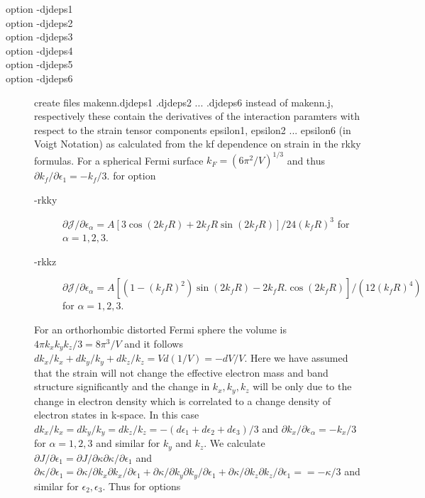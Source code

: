\begin{description}
\begin{description}
\item[option {\prg -djdeps1}]
\item[option {\prg  -djdeps2}]
\item[option {\prg -djdeps3}]
\item[option {\prg -djdeps4}]
\item[option {\prg  -djdeps5}]
\item[option {\prg -djdeps6 }]  create files {\prg makenn.djdeps1 .djdeps2 ... .djdeps6 }
instead of {\prg makenn.j}, respectively
 these contain the derivatives of the interaction paramters with respect to
 the strain tensor components epsilon1, epsilon2 ... epsilon6 (in Voigt Notation) as 
 calculated from the kf dependence on strain in the rkky formulas.
 For a spherical Fermi surface $k_F=(6\pi^2/V)^{1/3}$ and thus
$\partial k_f/\partial \epsilon_1=-k_f/3 $. 
 for option
\begin{description}
\item[-rkky]   $ \partial {\mathcal J}/\partial \epsilon_{\alpha} = A[3\cos(2k_fR)+2k_f R \sin(2k_fR)]/24(k_fR)^3$ for $\alpha=1,2,3$.
\item[-rkkz]  $ \partial {\mathcal J}/\partial \epsilon_{\alpha} =  A[(1-(k_fR)^2)\sin(2k_fR)-2k_fR.\cos(2k_fR)]/(12(k_fR)^4)$ for $\alpha=1,2,3$.
\end{description}
                 
For an orthorhombic distorted Fermi sphere the volume is $4\pi k_x k_y k_z/3=8\pi^3/V$ and
it follows $dk_x/k_x+dk_y/k_y+dk_z/k_z=V d(1/V)=-dV/V$. Here we have assumed that the strain will not change
the effective electron mass and band structure significantly and the change in $k_x,k_y,k_z$ will be
only due to the change in electron density which is correlated to a change density of electron states in k-space.
In this case  $dk_x/k_x=dk_y/k_y=dk_z/k_z=-(d\epsilon_1+d\epsilon_2+d\epsilon_3)/3$ and 
$\partial k_x/\partial \epsilon_{\alpha}=-k_x/3$ for ${\alpha}=1,2,3$ and similar for $k_y$ and $k_z$.
We calculate
$\partial J/\partial \epsilon_1=\partial J/\partial \kappa \partial \kappa/\partial \epsilon_1$
and 
$\partial \kappa/\partial \epsilon_1=\partial \kappa/\partial k_x \partial k_x/\partial \epsilon_1
+\partial \kappa/\partial k_y \partial k_y/\partial \epsilon_1
+\partial \kappa/\partial k_z \partial k_z/\partial \epsilon_1=
        = -\kappa/3 $
and similar for $\epsilon_2, \epsilon_3$.
Thus for options
\begin{description}
               

\end{description}
\end{description}
\end{description}
